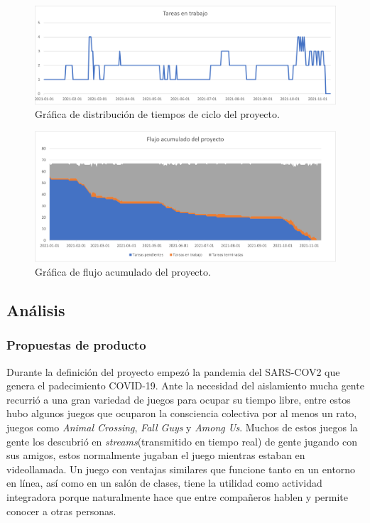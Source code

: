 \begin{figure}[H]
    \centering
    \includegraphics[width=0.8\linewidth]{images/TareasEnTrabajo.png}
    \caption{Gráfica de distribución de tiempos de ciclo del proyecto.}
    \label{fig:grafica_tiempos_ciclo}
\end{figure}

\begin{figure}[H]
    \centering
    \includegraphics[width=0.8\linewidth]{images/BurndownChart.png}
    \caption{Gráfica de flujo acumulado del proyecto.}
    \label{fig:grafica_flujo_acumulado}
\end{figure}

\subsection{Análisis}
\subsubsection{Propuestas de producto}
Durante la definición del proyecto empezó la pandemia del SARS-COV2 que genera el padecimiento COVID-19. Ante la necesidad del aislamiento mucha gente recurrió a una gran variedad de juegos para ocupar su tiempo libre, entre estos hubo algunos juegos que ocuparon la consciencia colectiva por al menos un rato, juegos como \textit{Animal Crossing}, \textit{Fall Guys} y \textit{Among Us}. Muchos de estos juegos la gente los descubrió en \textit{streams}(transmitido en tiempo real) de gente jugando con sus amigos, estos normalmente jugaban el juego mientras estaban en videollamada. Un juego con ventajas similares que funcione tanto en un entorno en línea, así como en un salón de clases, tiene la utilidad como actividad integradora porque naturalmente hace que entre compañeros hablen y permite conocer a otras personas.

